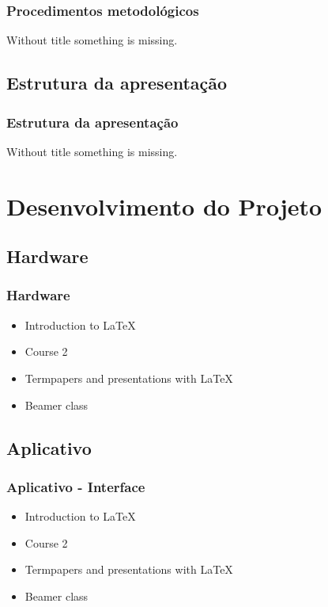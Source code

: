 \documentclass[hyperref={pdfpagelabels=false}]{beamer}
\begin{document}
            \begin{frame}\frametitle{Procedimentos metodológicos}
            Without title something is missing.
            \end{frame}

            \subsection{Estrutura da apresentação}

            \begin{frame}\frametitle{Estrutura da apresentação}
            Without title something is missing.
            \end{frame}

        \section{Desenvolvimento do Projeto}

            \subsection{Hardware}

            \begin{frame}\frametitle{Hardware}
            \begin{itemize}
            \item Introduction to  \LaTeX
            \item Course 2
            \item Termpapers and presentations with \LaTeX
            \item Beamer class
            \end{itemize}
            \end{frame}

            \subsection{Aplicativo}

            \begin{frame}\frametitle{Aplicativo - Interface}
            \begin{itemize}
            \item Introduction to  \LaTeX \pause
            \item Course 2 \pause
            \item Termpapers and presentations with \LaTeX \pause
            \item Beamer class
            \end{itemize}
            \end{frame}
\end{document}
